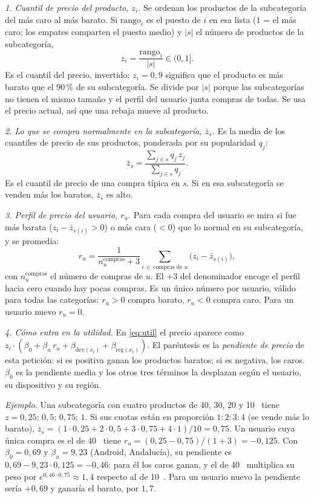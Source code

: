 \documentclass[11pt,a4paper]{article}
\begin{document}
\emph{1. Cuantil de precio del producto, $z_i$.} Se ordenan los productos de la subcategoría del más
caro al más barato. Si $\mathrm{rango}_i$ es el puesto de $i$ en esa lista ($1$ = el más caro; los
empates comparten el puesto medio) y $|s|$ el número de productos de la subcategoría,
\[
z_i=\frac{\mathrm{rango}_i}{|s|}\in(0,1].
\]
Es el cuantil del precio, invertido: $z_i=0{,}9$ significa que el producto es más barato que el
$90$\,\% de su subcategoría. Se divide por $|s|$ porque las subcategorías no tienen el mismo tamaño y el
perfil del usuario junta compras de todas. Se usa el precio actual, así que una rebaja mueve al producto.

\emph{2. Lo que se compra normalmente en la subcategoría, $\bar z_s$.} Es la media de los cuantiles de
precio de sus productos, ponderada por su popularidad $q_j$:
\[
\bar z_s=\frac{\sum_{j\in s}q_j\,z_j}{\sum_{j\in s}q_j}.
\]
Es el cuantil de precio de una compra típica en $s$. Si en esa subcategoría se venden más los baratos,
$\bar z_s$ es alto.

\emph{3. Perfil de precio del usuario, $r_u$.} Para cada compra del usuario se mira si fue más barata
($z_i-\bar z_{s(i)}>0$) o más cara ($<0$) que lo normal en su subcategoría, y se promedia:
\[
r_u=\frac{1}{n_u^{\text{compras}}+3}\sum_{i\,\in\,\text{compras de }u}\big(z_i-\bar z_{s(i)}\big),
\]
con $n_u^{\text{compras}}$ el número de compras de $u$. El $+3$ del denominador encoge el perfil hacia
cero cuando hay pocas compras. Es un único número por usuario, válido para todas las categorías:
$r_u>0$ compra barato, $r_u<0$ compra caro. Para un usuario nuevo $r_u=0$.

\emph{4. Cómo entra en la utilidad.} En \eqref{eq:util} el precio aparece como
$z_i\cdot(\beta_0+\beta_u\,r_u+\beta_{\text{dev}(x_t)}+\beta_{\text{reg}(x_t)})$. El paréntesis
es la \emph{pendiente de precio} de esta petición: si es positiva ganan los productos baratos; si es
negativa, los caros. $\beta_0$ es la pendiente media y los otros tres términos la desplazan según el
usuario, su dispositivo y su región.

\emph{Ejemplo.} Una subcategoría con cuatro productos de 40, 30, 20 y 10~\texteuro{} tiene
$z=0{,}25$; $0{,}5$; $0{,}75$; $1$. Si sus cuotas están en proporción $1:2:3:4$ (se vende más lo
barato), $\bar z_s=(1\cdot0{,}25+2\cdot0{,}5+3\cdot0{,}75+4\cdot1)/10=0{,}75$. Un usuario cuya
única compra es el de 40~\texteuro{} tiene $r_u=(0{,}25-0{,}75)/(1+3)=-0{,}125$. Con $\beta_0=0{,}69$ y
$\beta_u=9{,}23$ (Android, Andalucía), su pendiente es $0{,}69-9{,}23\cdot0{,}125=-0{,}46$: para él los
caros ganan, y el de 40~\texteuro{} multiplica su peso por $e^{0{,}46\cdot0{,}75}\approx1{,}4$ respecto al de
10~\texteuro{}. Para un usuario nuevo la pendiente sería $+0{,}69$ y ganaría el barato, por $1{,}7$.
\end{document}
